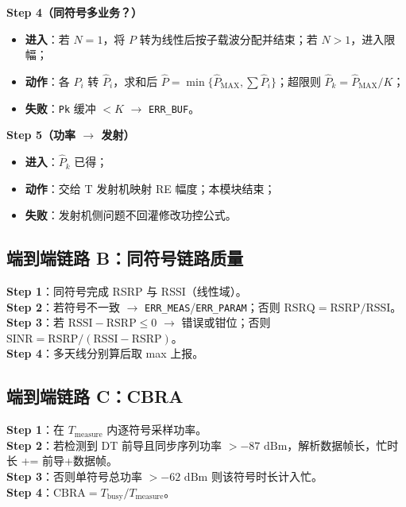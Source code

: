 \documentclass[11pt,a4paper]{ctexart}
\newcommand{\dBm}{\,\mathrm{dBm}}
\begin{document}
\textbf{Step 4（同符号多业务？）}
\begin{itemize}[nosep]
  \item \textbf{进入}：若 $N{=}1$，将 $P$ 转为线性后按子载波分配并结束；若 $N{>}1$，进入限幅；
  \item \textbf{动作}：各 $P_i$ 转 $\hat{P}_i$，求和后 $\hat{P}=\min\{\hat{P}_{\mathrm{MAX}},\sum\hat{P}_i\}$；超限则 $\hat{P}_k=\hat{P}_{\mathrm{MAX}}/K$；
  \item \textbf{失败}：\texttt{Pk} 缓冲 $<K$ $\rightarrow$ \texttt{ERR\_BUF}。
\end{itemize}

\textbf{Step 5（功率 $\rightarrow$ 发射）}
\begin{itemize}[nosep]
  \item \textbf{进入}：$\hat{P}_k$ 已得；
  \item \textbf{动作}：交给 T 发射机映射 RE 幅度；本模块结束；
  \item \textbf{失败}：发射机侧问题不回灌修改功控公式。
\end{itemize}

\subsection{端到端链路 B：同符号链路质量}

\textbf{Step 1}：同符号完成 RSRP 与 RSSI（线性域）。\\
\textbf{Step 2}：若符号不一致 $\rightarrow$ \texttt{ERR\_MEAS}/\texttt{ERR\_PARAM}；否则 $\mathrm{RSRQ}=\mathrm{RSRP}/\mathrm{RSSI}$。\\
\textbf{Step 3}：若 $\mathrm{RSSI}-\mathrm{RSRP}\leq 0$ $\rightarrow$ 错误或钳位；否则 $\mathrm{SINR}=\mathrm{RSRP}/(\mathrm{RSSI}-\mathrm{RSRP})$。\\
\textbf{Step 4}：多天线分别算后取 max 上报。

\subsection{端到端链路 C：CBRA}

\textbf{Step 1}：在 $T_{\mathrm{measure}}$ 内逐符号采样功率。\\
\textbf{Step 2}：若检测到 DT 前导且同步序列功率 $>-87\,\dBm$，解析数据帧长，忙时长 += 前导+数据帧。\\
\textbf{Step 3}：否则单符号总功率 $>-62\,\dBm$ 则该符号时长计入忙。\\
\textbf{Step 4}：$\mathrm{CBRA}=T_{\mathrm{busy}}/T_{\mathrm{measure}}$。
\end{document}
